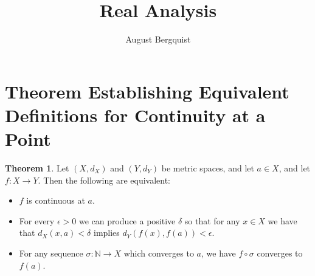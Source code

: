 \documentclass[11pt]{article}
\title{Real Analysis}
\author{August Bergquist}
\newcommand{\N}{\mathbb{N}}
\theoremstyle{definition}
\newtheorem{theorem}{Theorem}
\begin{document}
\maketitle


\section{Theorem Establishing Equivalent Definitions for Continuity at a Point}

\begin{theorem} Let $(X,d_X)$ and $(Y,d_Y)$ be metric spaces, and let $a\in X$, and let $f:X\to Y$. Then the following are equivalent:
\begin{itemize}
\item $f$ is continuous at $a$.
\item For every $\epsilon > 0$ we can produce a positive $\delta$ so that for any $x\in X$ we have that $d_X(x,a) < \delta$ implies $d_Y(f(x) , f(a) ) < \epsilon$.
\item For any sequence $\sigma:\N \to X$ which converges to $a$, we have $f\circ\sigma$ converges to $f(a)$.
\end{itemize}
\end{theorem}
\end{document}
